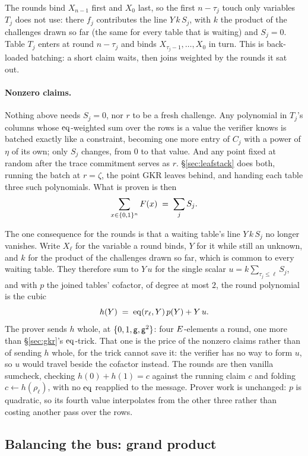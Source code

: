 The rounds bind $X_{n-1}$ first and $X_0$ last, so the first $n-\tau_j$ touch only variables $T_j$ does not use: there $f_j$ contributes the line $Y\,k\,S_j$, with $k$ the product of the challenges drawn so far (the same for every table that is waiting) and $S_j=0$. Table $T_j$ enters at round $n-\tau_j$ and binds $X_{\tau_j-1},\dots,X_0$ in turn. This is back-loaded batching: a short claim waits, then joins weighted by the rounds it sat out.

\paragraph{Nonzero claims.} Nothing above needs $S_j=0$, nor $r$ to be a fresh challenge. Any polynomial in $T_j$'s columns whose $\operatorname{eq}$-weighted sum over the rows is a value the verifier knows is batched exactly like a constraint, becoming one more entry of $C_j$ with a power of $\eta$ of its own; only $S_j$ changes, from $0$ to that value. And any point fixed at random after the trace commitment serves as $r$. \S\ref{sec:leafstack} does both, running the batch at $r=\zeta$, the point GKR leaves behind, and handing each table three such polynomials. What is proven is then
\[
  \sum_{x\in\{0,1\}^{n}}F(x)\;=\;\sum_j S_j .
\]

The one consequence for the rounds is that a waiting table's line $Y\,k\,S_j$ no longer vanishes. Write $X_\ell$ for the variable a round binds, $Y$ for it while still an unknown, and $k$ for the product of the challenges drawn so far, which is common to every waiting table. They therefore sum to $Y\,u$ for the single scalar $u=k\sum_{\tau_j\le\ell}S_j$, and with $p$ the joined tables' cofactor, of degree at most $2$, the round polynomial is the cubic
\[
  h(Y)\;=\;\operatorname{eq}(r_\ell,Y)\,p(Y)+Y\,u .
\]
The prover sends $h$ whole, at $\{0,1,\mathsf{g},\mathsf{g}^{2}\}$: four $E$-elements a round, one more than \S\ref{sec:gkr}'s $\operatorname{eq}$-trick. That one is the price of the nonzero claims rather than of sending $h$ whole, for the trick cannot save it: the verifier has no way to form $u$, so $u$ would travel beside the cofactor instead. The rounds are then vanilla sumcheck, checking $h(0)+h(1)=c$ against the running claim $c$ and folding $c\leftarrow h(\rho_\ell)$, with no $\operatorname{eq}$ reapplied to the message. Prover work is unchanged: $p$ is quadratic, so its fourth value interpolates from the other three rather than costing another pass over the rows.

\subsection{Balancing the bus: grand product}\label{sec:gp}

